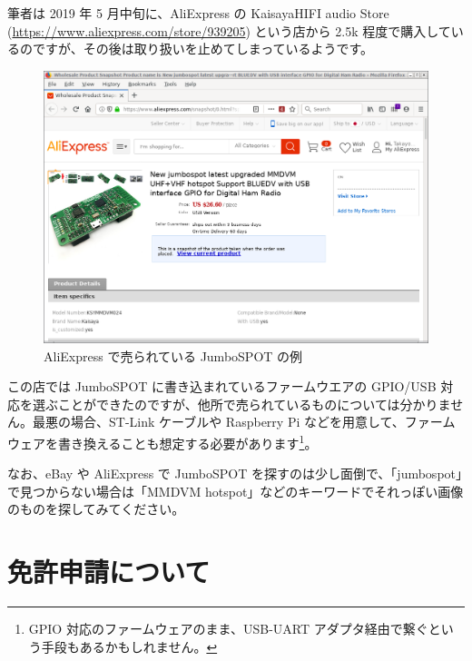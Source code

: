 \documentclass[a4j,oneside]{ujbook}
\begin{document}
筆者は 2019 年 5 月中旬に、AliExpress の KaisayaHIFI audio Store (\url{https://www.aliexpress.com/store/939205}) という店から \yen2.5k 程度で購入しているのですが、その後は取り扱いを止めてしまっているようです。
\begin{figure}[H]
 \centering
 \includegraphics[width=15cm]{img/jumbospot-aliexpress.png}
 \caption{AliExpress で売られている JumboSPOT の例}
\end{figure}
この店では JumboSPOT に書き込まれているファームウエアの GPIO/USB 対応を選ぶことができたのですが、他所で売られているものについては分かりません。最悪の場合、ST-Link ケーブルや Raspberry Pi などを用意して、ファームウェアを書き換えることも想定する必要があります\footnote {GPIO 対応のファームウェアのまま、USB-UART アダプタ経由で繋ぐという手段もあるかもしれません。}。

なお、eBay や AliExpress で JumboSPOT を探すのは少し面倒で、「jumbospot」で見つからない場合は「MMDVM hotspot」などのキーワードでそれっぽい画像のものを探してみてください。

\section{免許申請について}
\end{document}
